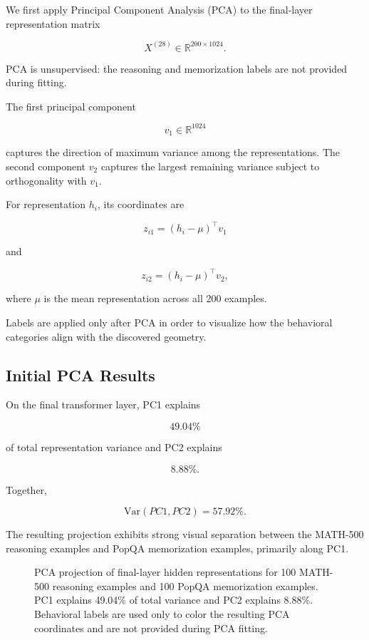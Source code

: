 \documentclass[11pt]{article}
\begin{document}
We first apply Principal Component Analysis (PCA) to the final-layer
representation matrix

\[
X^{(28)}
\in
\mathbb{R}^{200 \times 1024}.
\]

PCA is unsupervised: the reasoning and memorization labels are not
provided during fitting.

The first principal component

\[
v_1 \in \mathbb{R}^{1024}
\]

captures the direction of maximum variance among the representations.
The second component \(v_2\) captures the largest remaining variance
subject to orthogonality with \(v_1\).

For representation \(h_i\), its coordinates are

\[
z_{i1}
=
(h_i-\mu)^\top v_1
\]

and

\[
z_{i2}
=
(h_i-\mu)^\top v_2,
\]

where \(\mu\) is the mean representation across all 200 examples.

Labels are applied only after PCA in order to visualize how the
behavioral categories align with the discovered geometry.


\subsection{Initial PCA Results}

On the final transformer layer, PC1 explains

\[
49.04\%
\]

of total representation variance and PC2 explains

\[
8.88\%.
\]

Together,

\[
\mathrm{Var}(PC1,PC2)=57.92\%.
\]

The resulting projection exhibits strong visual separation between
the MATH-500 reasoning examples and PopQA memorization examples,
primarily along PC1.

\begin{figure}[H]
    \centering



    \caption{
    PCA projection of final-layer hidden representations for 100
    MATH-500 reasoning examples and 100 PopQA memorization examples.
    PC1 explains 49.04\% of total variance and PC2 explains 8.88\%.
    Behavioral labels are used only to color the resulting PCA
    coordinates and are not provided during PCA fitting.
    }

    \label{fig:initial-pca}

\end{figure}
\end{document}

